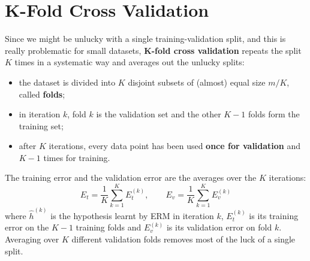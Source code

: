 \section{K-Fold Cross Validation}

Since we might be unlucky with a single training-validation split, and this is really problematic for small datasets, \textbf{K-fold cross validation} repeats the split $K$ times in a systematic way and averages out the unlucky splits:
\begin{itemize}
    \item the dataset is divided into $K$ disjoint subsets of (almost) equal size $m/K$, called \textbf{folds};
    \item in iteration $k$, fold $k$ is the validation set and the other $K-1$ folds form the training set;
    \item after $K$ iterations, every data point has been used \textbf{once for validation} and $K-1$ times for training.
\end{itemize}
The training error and the validation error are the averages over the $K$ iterations:
\[
E_t = \frac{1}{K}\sum_{k=1}^{K} E_t^{(k)}, \qquad E_v = \frac{1}{K}\sum_{k=1}^{K} E_v^{(k)}
\]
where $\widehat{h}^{(k)}$ is the hypothesis learnt by ERM in iteration $k$, $E_t^{(k)}$ is its training error on the $K-1$ training folds and $E_v^{(k)}$ is its validation error on fold $k$. Averaging over $K$ different validation folds removes most of the luck of a single split.

\begin{center}
\end{center}

